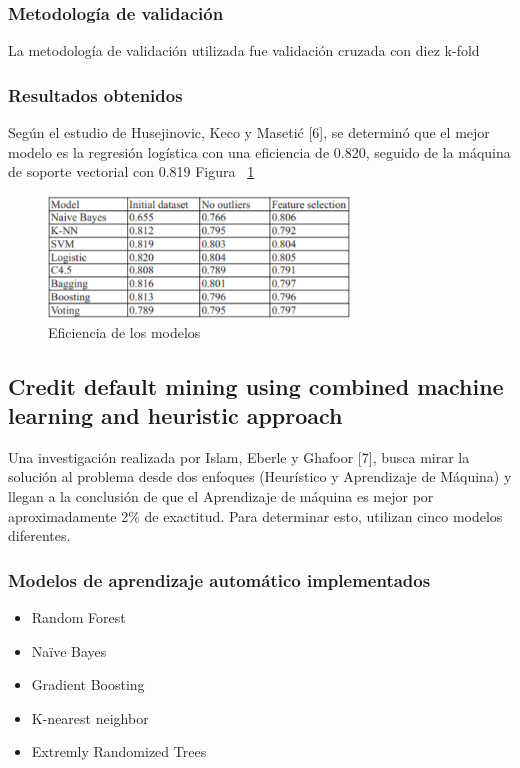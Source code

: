 \documentclass[conference]{IEEEtran}
\begin{document}
\subsubsection{Metodología de validación}\hfill

La metodología de validación utilizada fue validación cruzada con diez k-fold
\\

\subsubsection{Resultados obtenidos}\hfill

Según el estudio de  Husejinovic, Keco y Masetić [6], se determinó que el mejor modelo es la regresión logística con una eficiencia de 0.820, seguido de la máquina de soporte vectorial con 0.819 Figura ~\ref{fig:Accuracy_4}
\\

\begin{center}
    \begin{figure}[h]
        \hfill
            \includegraphics[width=8cm]{Accuracy_4.png}\hspace*{\fill}
    \caption{Eficiencia de los modelos}
    \label{fig:Accuracy_4}
    \end{figure}
\end{center}

\subsection{Credit default mining using combined machine learning and heuristic approach}

Una investigación realizada por Islam, Eberle y Ghafoor [7], busca mirar la solución al problema desde dos enfoques (Heurístico y Aprendizaje de Máquina) y llegan a la conclusión de que el Aprendizaje de máquina es mejor por aproximadamente 2\% de exactitud. Para determinar esto, utilizan cinco modelos diferentes. 
\\

\subsubsection{Modelos de aprendizaje automático implementados}
\begin{itemize}
\item Random Forest
\item Naïve Bayes
\item Gradient Boosting
\item K-nearest neighbor
\item Extremly Randomized Trees
\end{itemize}
\hfill
\end{document}
